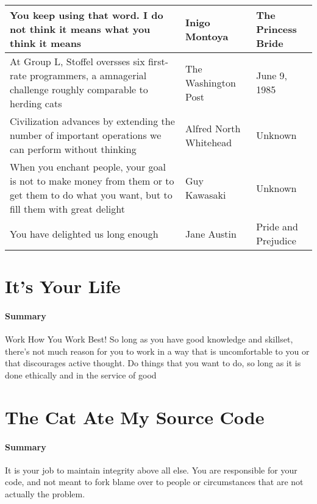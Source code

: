 \documentclass{article}
\begin{document}
    \begin{tabularx}{0.8\textwidth}{
    | >{\centering\arraybackslash}X
    | >{\centering\arraybackslash}X
    | >{\centering\arraybackslash}X |}
    \hline

    You keep using that word. I do not think it means what you think it means
    & Inigo Montoya
    & The Princess Bride \\

    \hline

    At Group L, Stoffel oversses six first-rate programmers, a amnagerial challenge roughly comparable to herding cats
    & The Washington Post
    & June 9, 1985 \\

    \hline

    Civilization advances by extending the number of important operations we can perform without thinking
    & Alfred North Whitehead
    & Unknown \\

    \hline

    When you enchant people, your goal is not to make money from them or to get them to do what you want, but to fill them with great delight
    & Guy Kawasaki
    & Unknown \\

    \hline

    You have delighted us long enough
    & Jane Austin
    & Pride and Prejudice \\

    \hline
    \end{tabularx}

\section{It's Your Life}
    \paragraph{Summary}
    Work How You Work Best! So long as you have good knowledge and skillset, there's not much reason for you to work in a way that is uncomfortable to you or that discourages active thought. Do things that you want to do, so long as it is done ethically and in the service of good

\section{The Cat Ate My Source Code}
    \paragraph{Summary}
    It is your job to maintain integrity above all else. You are responsible for your code, and not meant to fork blame over to people or circumstances that are not actually the problem.
\end{document}
